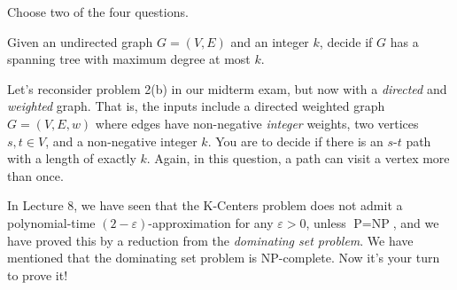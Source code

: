 \documentclass{oxmathproblems}
\begin{document}
Choose two of the four questions.

\begin{questions}

\miquestion[50] 
Given an undirected graph $G=(V,E)$ and an integer $k$, decide if $G$ has a spanning tree with maximum degree at most $k$. 

\miquestion[50]
Let's reconsider problem 2(b) in our midterm exam, but now with a \emph{directed} and \emph{weighted} graph.
That is, the inputs include a directed weighted graph $G=(V,E,w)$ where edges have non-negative \emph{integer} weights, two vertices $s,t\in V$, and a non-negative integer $k$. You are to decide if there is an $s$-$t$ path with a length of exactly $k$. Again, in this question, a path can visit a vertex more than once.

\miquestion[50]
In Lecture 8, we have seen that the K-Centers problem does not admit a polynomial-time $(2-\varepsilon)$-approximation for any $\varepsilon>0$, unless $\text{P}=\text{NP}$, and we have proved this by a reduction from the \emph{dominating set problem}.
We have mentioned that the dominating set problem is NP-complete.
Now it's your turn to prove it!


\end{questions}
\end{document}

